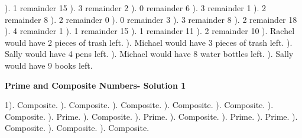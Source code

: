 \documentclass{article}%
\begin{document}
). 1 remainder 15%
). 3 remainder 2%
). 0 remainder 6%
). 3 remainder 1%
). 2 remainder 8%
). 2 remainder 0%
). 0 remainder 3%
). 3 remainder 8%
). 2 remainder 18%
). 4 remainder 1%
). 1 remainder 15%
). 1 remainder 11%
). 2 remainder 10%
). Rachel would have 2 pieces of trash left.%
). Michael would have 3 pieces of trash left.%
). Sally would have 4 pens left.%
). Michael would have 8 water bottles left.%
). Sally would have 9 books left.%
\newline%
\newpage%
\large%
\begin{center}%
\textbf{Prime and Composite Numbers- Solution 1}%
\newline%
\end{center} \normalsize%
1). Composite.%
). Composite.%
). Composite.%
). Composite.%
). Composite.%
). Composite.%
). Prime.%
). Composite.%
). Prime.%
). Composite.%
). Prime.%
). Prime.%
). Composite.%
). Composite.%
). Composite.%
\end{document}
